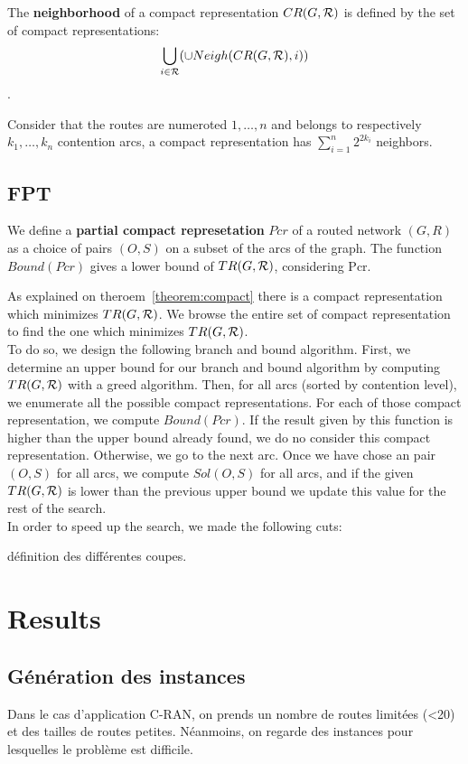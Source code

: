 \documentclass[english]{article}
\begin{document}
The \textbf{neighborhood} of a compact representation $CR(G,{\cal R})$ is defined by the set of compact representations: $$ \bigcup_{i\in{\cal R}} (\cup Neigh(CR(G,{\cal R}),i) ) $$.

 Consider that the routes are numeroted $1,\ldots,n$ and belongs to respectively $k_1,\ldots,k_n$ contention arcs, a compact representation has $\sum_{i=1}^n 2^{2k_i} $ neighbors.


 
\subsection{FPT}
We define a \textbf{partial compact represetation} $Pcr$ of a routed network $(G,R)$ as a choice of pairs $(O,S)$ on a subset of the arcs of the graph.
The function $Bound(Pcr)$ gives a lower bound of $TR(G,{\cal R})$, considering Pcr.


 As explained on theroem~\ref{theorem:compact} there is a compact representation which minimizes $TR(G,{\cal R})$. We browse the entire set of compact representation to find the one which minimizes $TR(G,{\cal R})$.\\
 To do so, we design the following branch and bound algorithm. First, we determine an upper bound for our branch and bound algorithm by computing $TR(G,{\cal R})$ with a greed algorithm. Then, for all arcs (sorted by contention level), we enumerate all the possible compact representations. For each of those compact representation, we compute $Bound(Pcr)$. If the result given by this function is higher than the upper bound already found, we do no consider this compact representation. Otherwise, we go to the next arc. Once we have chose an pair $(O,S)$ for all arcs, we compute $Sol(O,S)$ for all arcs, and if the given $TR(G,{\cal R})$ is lower than the previous upper bound we update this value for the rest of the search.\\


In order to speed up the search, we made the following cuts:

définition des différentes coupes.\\
\section{Results}




\subsection{Génération des instances}
Dans le cas d'application C-RAN, on prends un nombre de routes limitées (<20) et des tailles de routes petites. Néanmoins, on regarde des instances pour lesquelles le problème est difficile.\
\end{document}
